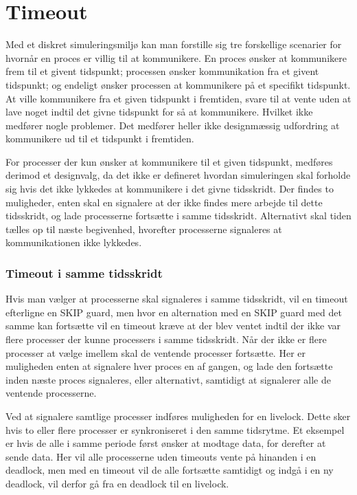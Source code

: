 \section{Timeout} 
\begin{shaded}
Med et diskret simuleringsmiljø kan man forstille sig tre forskellige scenarier for  hvornår  en proces er villig
til at kommunikere. En proces ønsker at kommunikere  frem til et givent tidspunkt; processen ønsker kommunikation fra et givent tidspunkt; og endeligt ønsker processen at kommunikere på et specifikt tidspunkt.
At ville kommunikere fra et given tidspunkt i fremtiden, svare til at   
vente uden at lave noget indtil det givne tidspunkt for så at kommunikere. Hvilket ikke medfører nogle problemer. Det medfører heller ikke  designmæssig udfordring at kommunikere ud til et tidspunkt i fremtiden.

For processer der kun ønsker at kommunikere til et given tidspunkt,
medføres derimod et designvalg, da det ikke er defineret hvordan simuleringen skal forholde sig hvis det ikke lykkedes at kommunikere   
i det givne tidsskridt. Der findes to muligheder, enten skal \sched     
en signalere at der ikke findes mere arbejde til dette tidsskridt, og   
lade processerne fortsætte i samme tidsskridt. Alternativt skal tiden   
tælles op til næste begivenhed, hvorefter processerne signaleres at    
kommunikationen ikke lykkedes. 


\subsubsection{Timeout i samme tidsskridt} 
Hvis man vælger at processerne skal signaleres i samme tidsskridt, vil en timeout
efterligne en SKIP guard, men hvor en alternation med en SKIP guard med
det samme kan fortsætte vil en timeout kræve at der blev ventet indtil
der ikke var flere processer der kunne processers i samme tidsskridt.
Når der ikke er flere processer at vælge imellem skal de ventende
processer fortsætte. Her er muligheden enten at signalere hver proces
en af gangen, og lade den fortsætte inden næste proces signaleres,
eller alternativt, samtidigt at signalerer alle de ventende processerne.

Ved at signalere samtlige processer indføres muligheden for en
livelock. Dette sker hvis to eller flere processer er synkroniseret i
den samme tidsrytme. Et eksempel er hvis de alle i samme periode først
ønsker at modtage data, for derefter at sende data. Her vil alle
processerne uden timeouts vente på hinanden i en deadlock, men med en
timeout vil de alle fortsætte samtidigt og indgå i en ny deadlock,
\pycsp vil derfor gå fra en deadlock til en livelock. 


\end{shaded}
